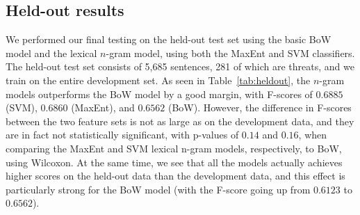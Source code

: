 \documentclass[11pt,letterpaper]{article}
\begin{document}
      
      


\subsection{Held-out results}
\label{sec:heldout}

We performed our final testing on the held-out test set using the basic BoW model and the lexical $n$-gram model, using both the MaxEnt and SVM classifiers. The held-out test set consists of 5,685 sentences, 281 of which are threats, and we train on the entire development set. As seen in Table~\ref{tab:heldout}, the $n$-gram models outperforms the BoW model by a good margin, with F-scores of $0.6885$ (SVM), $0.6860$ (MaxEnt), and $0.6562$ (BoW). However, the difference in F-scores between the two feature sets is not as large as on the development data, and they are in fact not statistically significant, with p-values of $0.14$ and $0.16$, when comparing the MaxEnt and SVM lexical n-gram models, respectively, to BoW, using Wilcoxon. At the same time, we see that all the models actually achieves higher scores on the held-out data than the development data, and this effect is particularly strong for the BoW model (with the F-score going up from $0.6123$ to $0.6562$). %


\end{document}
